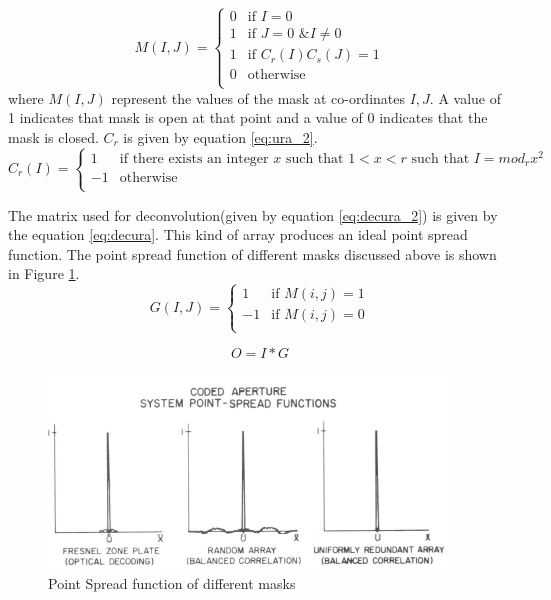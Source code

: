 \begin{equation}
  M(I,J) =
  \begin{cases}
    0 & \text{if $I = 0$} \\
    1 & \text{if $J = 0$ \& $I\neq 0$} \\
    1 & \text{if $C_r(I)C_s(J) = 1$} \\
    0 & \text{otherwise}\\
  \end{cases}
  \label{eq:ura}
\end{equation}
where $M(I,J)$ represent the values of the mask at co-ordinates $I,J$. A value of 1 indicates that mask is open at that point and a value of 0 indicates that the mask is closed. $C_r$ is given by equation \ref{eq:ura_2}.
\begin{equation}
  C_r(I) =
  \begin{cases}
    1 & \text{if there exists an integer $x$ such that 
    $1<x<r$ 
    such that $I = mod_rx^2$    
    } \\
    -1 & \text{otherwise} \\
  \end{cases}
  \label{eq:ura_2}
\end{equation}

The matrix used for deconvolution(given by equation \ref{eq:decura_2}) is given by the equation \ref{eq:decura}. This kind of array produces an ideal point spread function. The point spread function of different masks discussed above is shown in Figure \ref{fig:psf_old_mask}.
\begin{equation}
  G(I,J) =
  \begin{cases}
    1 & \text{if $M(i,j) = 1$} \\
    -1 & \text{if $M(i,j) = 0$} \\
  \end{cases}
  \label{eq:decura}
\end{equation}

\begin{equation}
O = I * G
\label{eq:decura_2}
\end{equation}

\begin{figure}[ht]
\includegraphics[width=\textwidth]{pics/psf_mask}
\caption{Point Spread function of different masks\cite{Fenimore:78}}
\label{fig:psf_old_mask}
\end{figure}

